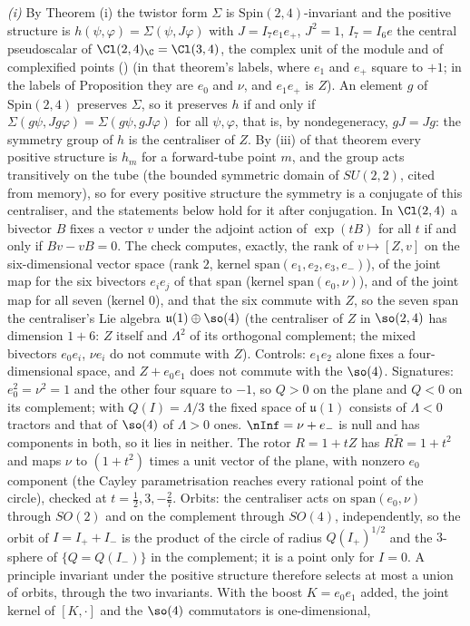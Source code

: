\emph{(i)} By Theorem (i) the twistor form $\Sigma$ is $\mathrm{Spin}(2,4)$-invariant and the positive structure is $h(\psi, \varphi) = \Sigma(\psi, J\varphi)$ with $J = I_{7}e_{1}e_{+}$, $J^{2} = 1$, $I_7 = I_6e$ the central pseudoscalar of $\Cl(2,4)_{\C} = \Cl(3,4)$, the complex unit of the module and of complexified points () (in that theorem's labels, where $e_{1}$ and $e_{+}$ square to $+1$; in the labels of Proposition  they are $e_{0}$ and $\nu$, and $e_{1}e_{+}$ is $Z$). An element $g$ of $\mathrm{Spin}(2,4)$ preserves $\Sigma$, so it preserves $h$ if and only if $\Sigma(g\psi, Jg\varphi) = \Sigma(g\psi, gJ\varphi)$ for all $\psi, \varphi$, that is, by nondegeneracy, $gJ = Jg$: the symmetry group of $h$ is the centraliser of $Z$. By (iii) of that theorem every positive structure is $h_{m}$ for a forward-tube point $m$, and the group acts transitively on the tube (the bounded symmetric domain of $SU(2,2)$, cited from memory), so for every positive structure the symmetry is a conjugate of this centraliser, and the statements below hold for it after conjugation. In $\Cl(2,4)$ a bivector $B$ fixes a vector $v$ under the adjoint action of $\exp(tB)$ for all $t$ if and only if $Bv - vB = 0$. The check computes, exactly, the rank of $v \mapsto [Z, v]$ on the six-dimensional vector space (rank $2$, kernel $\mathrm{span}(e_{1}, e_{2}, e_{3}, e_{-})$), of the joint map for the six bivectors $e_{i}e_{j}$ of that span (kernel $\mathrm{span}(e_{0}, \nu)$), and of the joint map for all seven (kernel $0$), and that the six commute with $Z$, so the seven span the centraliser's Lie algebra $\mathfrak{u}(1)\oplus\so(4)$ (the centraliser of $Z$ in $\so(2,4)$ has dimension $1 + 6$: $Z$ itself and $\Lambda^{2}$ of its orthogonal complement; the mixed bivectors $e_{0}e_{i}$, $\nu e_{i}$ do not commute with $Z$). Controls: $e_{1}e_{2}$ alone fixes a four-dimensional space, and $Z + e_{0}e_{1}$ does not commute with the $\so(4)$. Signatures: $e_{0}^{2} = \nu^{2} = 1$ and the other four square to $-1$, so $Q > 0$ on the plane and $Q < 0$ on its complement; with $Q(I) = \Lambda/3$ the fixed space of $\mathfrak{u}(1)$ consists of $\Lambda < 0$ tractors and that of $\so(4)$ of $\Lambda > 0$ ones. $\nInf = \nu + e_{-}$ is null and has components in both, so it lies in neither. The rotor $R = 1 + tZ$ has $R\tilde R = 1 + t^{2}$ and maps $\nu$ to $(1 + t^{2})$ times a unit vector of the plane, with nonzero $e_{0}$ component (the Cayley parametrisation reaches every rational point of the circle), checked at $t = \tfrac12, 3, -\tfrac27$. Orbits: the centraliser acts on $\mathrm{span}(e_{0}, \nu)$ through $SO(2)$ and on the complement through $SO(4)$, independently, so the orbit of $I = I_{+} + I_{-}$ is the product of the circle of radius $Q(I_{+})^{1/2}$ and the $3$-sphere of $\{Q = Q(I_{-})\}$ in the complement; it is a point only for $I = 0$. A principle invariant under the positive structure therefore selects at most a union of orbits, through the two invariants. With the boost $K = e_{0}e_{1}$ added, the joint kernel of $[K, \cdot]$ and the $\so(4)$ commutators is one-dimensional, 